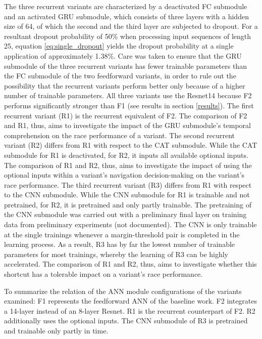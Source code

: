 The three recurrent variants
are characterized by a deactivated FC submodule and 
an activated GRU submodule,
which consists of three layers
with a hidden size of 64,
of which the second and the third layer
are subjected to dropout.
For a resultant dropout probability of 50\%
when processing input sequences of length 25,
equation \ref{eq:single_dropout} yields the dropout probability 
at a single application of approximately 1.38\%.
Care was taken to ensure that the GRU submodule 
of the three recurrent variants has fewer trainable parameters
than the FC submodule of the two feedforward variants,
in order to rule out the possibility 
that the recurrent variants perform better only 
because of a higher number of trainable parameters.
All three variants use the Resnet14 
because F2 performs significantly stronger than F1
(see results in section \ref{results}).
The first recurrent variant (R1)
is the recurrent equivalent of F2.
The comparison of F2 and R1, thus,
aims to investigate the impact of the GRU submodule's 
temporal comprehension on the race performance of a variant.
The second recurrent variant (R2) differs 
from R1 with respect to the CAT submodule.
While the CAT submodule for R1 is deactivated,
for R2, it inputs
all available optional inputs.
The comparison of R1 and R2, thus,
aims to investigate the impact of 
using the optional inputs
within a variant's navigation decision-making
on the variant's race performance.
The third recurrent variant (R3) differs 
from R1 with respect to the CNN submodule.
While the CNN submodule for R1 is trainable and not pretrained,
for R2, it is pretrained and only partly trainable.
The pretraining of the CNN submodule
was carried out with a preliminary final layer
on training data from 
preliminary experiments (not documented).
The CNN is only trainable at the single trainings
whenever a margin-threshold pair is completed in the learning process.
As a result, R3 has by far the lowest number of trainable parameters
for most trainings, whereby 
the learning of R3 can be highly accelerated.
The comparison of R1 and R2, thus,
aims to investigate 
whether this shortcut
has a tolerable impact on a
variant's race performance.

To summarize the relation of the ANN module configurations of the variants examined: 
F1 represents the feedforward ANN of the baseline work.
F2 integrates a 14-layer instead of an 8-layer Resnet.
R1 is the recurrent counterpart of F2.
R2 additionally uses the optional inputs.
The CNN submodule of R3 is pretrained  
and trainable only partly in time.

